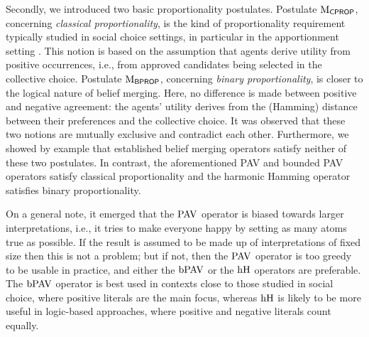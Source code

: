 Secondly,
we introduced two basic proportionality postulates.
Postulate $\mathrm{M}_{\mathsf{CPROP}}$, concerning \emph{classical proportionality}, 
is the kind of proportionality requirement typically 
studied in social choice settings, 
in particular in the apportionment setting
\cite{BalinskiY82}. This notion is based on the assumption that agents derive 
utility from positive occurrences, i.e., from approved candidates being selected in the collective choice.
Postulate $\mathrm{M}_{\mathsf{BPROP}}$, concerning \emph{binary proportionality}, 
is closer to the logical nature of belief merging. 
Here, no difference is made between positive and negative agreement: 
the agents' utility derives from the (Hamming) distance between their preferences and the collective choice.
It was observed that these two notions are mutually exclusive and contradict each other.
Furthermore, we showed by example that established belief merging operators satisfy neither of these two postulates.
In contrast, the aforementioned PAV and bounded PAV operators satisfy classical 
proportionality and the harmonic Hamming operator satisfies binary proportionality.

On a general note, it emerged that the $\mathrm{PAV}$ operator 
is biased towards larger interpretations, i.e., it tries to make 
everyone happy by setting as many atoms true as possible. If the 
result is assumed to be made up of interpretations of fixed size
then this is not a problem; but if not, then the $\mathrm{PAV}$ operator
is too greedy to be usable in practice, and either the $\mathrm{bPAV}$ 
or the $\mathrm{hH}$ operators are preferable. The $\mathrm{bPAV}$ operator 
is best used in contexts close to those studied in social choice, 
where positive literals are the main focus, whereas $\mathrm{hH}$
is likely to be more useful in logic-based approaches, 
where positive and negative literals count equally. 